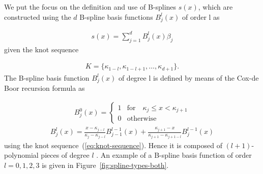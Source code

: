 \documentclass[10pt,a4paper]{report}
\begin{document}
We put the focus on the definition and use of B-splines $s(x)$, which are constructed using the $d$ B-spline basis functions $B_j^l(x)$ of order l as

\begin{align}
	s(x) = \sum_{j=1}^d B_j^l(x) \beta_j 
\end{align}
%
given the knot sequence 

\begin{align} \label{eq:knot-sequence}
	K = \{\kappa_{1-l}, \kappa_{1-l+1}, \dots, \kappa_{d+1}\}.
\end{align}
%
The B-spline basis function $B_j^l(x)$ of degree l is defined by means of the Cox-de Boor recursion formula as

\begin{align} \label{eq:Bspline_recDef1}
	B_j^0(x) = \begin{cases} 1 & \text{for} \quad \kappa_j \le x < \kappa_{j+1} \\ 
					 		 0 & \text{otherwise} 
	\end{cases}
\end{align}
\begin{align} \label{eq:Bspline_recDef2}
	B_j^l(x) = \frac{x - \kappa_{j-l}}{\kappa_{j} - \kappa_{j-l}} B_{j-1}^{l-1}(x) + \frac{\kappa_{j+1} - x}{\kappa_{j+1} - \kappa_{j+1-l}} B_{j}^{l-1}(x)
\end{align}
%
using the knot sequence~(\ref{eq:knot-sequence}). Hence it is composed of $(l+1)$-polynomial pieces of degree $l$ \cite{fahrmeir2007regression}. An example of a B-spline basis function of order $l=0, 1, 2, 3$ is given in Figure~\ref{fig:spline-types-both}. 
\end{document}
